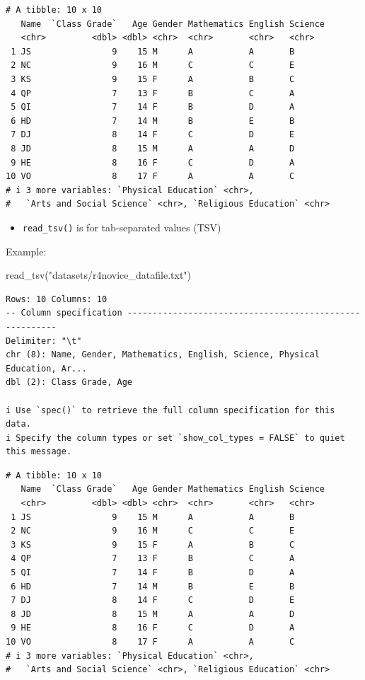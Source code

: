 \documentclass[
  letterpaper,
  DIV=11,
  numbers=noendperiod]{scrreprt}
\newenvironment{Shaded}{\begin{snugshade}}{\end{snugshade}}
\newcommand{\FunctionTok}[1]{\textcolor[rgb]{0.28,0.35,0.67}{#1}}
\newcommand{\NormalTok}[1]{\textcolor[rgb]{0.00,0.23,0.31}{#1}}
\newcommand{\StringTok}[1]{\textcolor[rgb]{0.13,0.47,0.30}{#1}}
\providecommand{\tightlist}{%
  \setlength{\itemsep}{0pt}\setlength{\parskip}{0pt}}\usepackage{longtable,booktabs,array}
\begin{document}
\begin{verbatim}
# A tibble: 10 x 10
   Name  `Class Grade`   Age Gender Mathematics English Science
   <chr>         <dbl> <dbl> <chr>  <chr>       <chr>   <chr>  
 1 JS                9    15 M      A           A       B      
 2 NC                9    16 M      C           C       E      
 3 KS                9    15 F      A           B       C      
 4 QP                7    13 F      B           C       A      
 5 QI                7    14 F      B           D       A      
 6 HD                7    14 M      B           E       B      
 7 DJ                8    14 F      C           D       E      
 8 JD                8    15 M      A           A       D      
 9 HE                8    16 F      C           D       A      
10 VO                8    17 F      A           A       C      
# i 3 more variables: `Physical Education` <chr>,
#   `Arts and Social Science` <chr>, `Religious Education` <chr>
\end{verbatim}

\begin{itemize}
\tightlist
\item
  \texttt{read\_tsv()} is for tab-separated values (TSV)
\end{itemize}

Example:

\begin{Shaded}
\begin{Highlighting}[]
\FunctionTok{read\_tsv}\NormalTok{(}\StringTok{"datasets/r4novice\_datafile.txt"}\NormalTok{)}
\end{Highlighting}
\end{Shaded}

\begin{verbatim}
Rows: 10 Columns: 10
-- Column specification --------------------------------------------------------
Delimiter: "\t"
chr (8): Name, Gender, Mathematics, English, Science, Physical Education, Ar...
dbl (2): Class Grade, Age

i Use `spec()` to retrieve the full column specification for this data.
i Specify the column types or set `show_col_types = FALSE` to quiet this message.
\end{verbatim}

\begin{verbatim}
# A tibble: 10 x 10
   Name  `Class Grade`   Age Gender Mathematics English Science
   <chr>         <dbl> <dbl> <chr>  <chr>       <chr>   <chr>  
 1 JS                9    15 M      A           A       B      
 2 NC                9    16 M      C           C       E      
 3 KS                9    15 F      A           B       C      
 4 QP                7    13 F      B           C       A      
 5 QI                7    14 F      B           D       A      
 6 HD                7    14 M      B           E       B      
 7 DJ                8    14 F      C           D       E      
 8 JD                8    15 M      A           A       D      
 9 HE                8    16 F      C           D       A      
10 VO                8    17 F      A           A       C      
# i 3 more variables: `Physical Education` <chr>,
#   `Arts and Social Science` <chr>, `Religious Education` <chr>
\end{verbatim}
\end{document}
